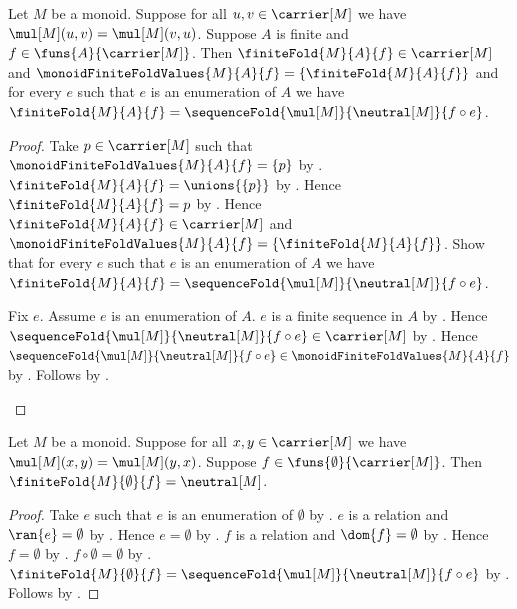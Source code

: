 \begin{theorem}\label{monoid_finite_fold_canonical}
    Let $M$ be a monoid.
    Suppose for all $u,v\in\carrier[M]$ we have
        $\mul[M](u,v)=\mul[M](v,u)$.
    Suppose $A$ is finite and $f\in\funs{A}{\carrier[M]}$.
    Then
        $\finiteFold{M}{A}{f}\in\carrier[M]$ and
        $\monoidFiniteFoldValues{M}{A}{f}
            =\{\finiteFold{M}{A}{f}\}$ and
        for every $e$ such that $e$ is an enumeration of $A$ we have
            $\finiteFold{M}{A}{f}
                =\sequenceFold{\mul[M]}{\neutral[M]}{f\circ e}$.
\end{theorem}
\begin{proof}
    Take $p\in\carrier[M]$ such that
        $\monoidFiniteFoldValues{M}{A}{f}=\{p\}$ by
        .
    $\finiteFold{M}{A}{f}=\unions{\{p\}}$ by
        .
    Hence $\finiteFold{M}{A}{f}=p$ by
        .
    Hence $\finiteFold{M}{A}{f}\in\carrier[M]$ and
        $\monoidFiniteFoldValues{M}{A}{f}
            =\{\finiteFold{M}{A}{f}\}$.
    Show that for every $e$ such that $e$ is an enumeration of $A$
        we have
            $\finiteFold{M}{A}{f}
                =\sequenceFold{\mul[M]}{\neutral[M]}{f\circ e}$.
    \begin{subproof}
        Fix $e$.
        Assume $e$ is an enumeration of $A$.
        $e$ is a finite sequence in $A$ by
            .
        Hence
            $\sequenceFold{\mul[M]}{\neutral[M]}{f\circ e}
                \in\carrier[M]$ by .
        Hence
            $\sequenceFold{\mul[M]}{\neutral[M]}{f\circ e}
                \in\monoidFiniteFoldValues{M}{A}{f}$ by
            .
        Follows by .
    \end{subproof}
\end{proof}

\begin{proposition}\label{monoid_finite_fold_empty}
    Let $M$ be a monoid.
    Suppose for all $x,y\in\carrier[M]$ we have
        $\mul[M](x,y)=\mul[M](y,x)$.
    Suppose $f\in\funs{\emptyset}{\carrier[M]}$.
    Then $\finiteFold{M}{\emptyset}{f}=\neutral[M]$.
\end{proposition}
\begin{proof}
    Take $e$ such that $e$ is an enumeration of $\emptyset$ by
        .
    $e$ is a relation and $\ran{e}=\emptyset$ by
        .
    Hence $e=\emptyset$ by
        .
    $f$ is a relation and $\dom{f}=\emptyset$ by
        .
    Hence $f=\emptyset$ by
        .
    $f\circ\emptyset=\emptyset$ by
        .
    $\finiteFold{M}{\emptyset}{f}
        =\sequenceFold{\mul[M]}{\neutral[M]}{f\circ e}$ by
        .
    Follows by .
\end{proof}

